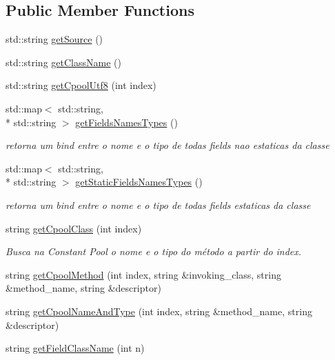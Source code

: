 \subsection*{Public Member Functions}
\begin{DoxyCompactItemize}
\item 
std\+::string \hyperlink{classClassFile_a327e97890dd251532d064da9aa61deeb}{get\+Source} ()
\item 
std\+::string \hyperlink{classClassFile_a325315e2b9ccf9c10955467aae82b2a1}{get\+Class\+Name} ()
\item 
std\+::string \hyperlink{classClassFile_a917fdac173079a7eebacb22b728f295d}{get\+Cpool\+Utf8} (int index)
\item 
std\+::map$<$ std\+::string, \\*
std\+::string $>$ \hyperlink{classClassFile_aa791a7b86ab130ba6ba28d6d71f2c70c}{get\+Fields\+Names\+Types} ()
\begin{DoxyCompactList}\small\item\em retorna um bind entre o nome e o tipo de todas fields nao estaticas da classe \end{DoxyCompactList}\item 
std\+::map$<$ std\+::string, \\*
std\+::string $>$ \hyperlink{classClassFile_ad63127cb4ef56f97cffc2cb875a1d144}{get\+Static\+Fields\+Names\+Types} ()
\begin{DoxyCompactList}\small\item\em retorna um bind entre o nome e o tipo de todas fields estaticas da classe \end{DoxyCompactList}\item 
string \hyperlink{classClassFile_a5fc6d3752ad2616f5e7bcb8402e93c7a}{get\+Cpool\+Class} (int index)
\begin{DoxyCompactList}\small\item\em Busca na Constant Pool o nome e o tipo do método a partir do index. \end{DoxyCompactList}\item 
string \hyperlink{classClassFile_ae9258a6814dde7cf8e0be3f3c6533fa1}{get\+Cpool\+Method} (int index, string \&invoking\+\_\+class, string \&method\+\_\+name, string \&descriptor)
\item 
string \hyperlink{classClassFile_a5d47b42f630f4e1710cdd1155168f598}{get\+Cpool\+Name\+And\+Type} (int index, string \&method\+\_\+name, string \&descriptor)
\item 
string \hyperlink{classClassFile_a6088b3d4e2980da3f62d36c647f5867a}{get\+Field\+Class\+Name} (int n)

\end{DoxyCompactItemize}

